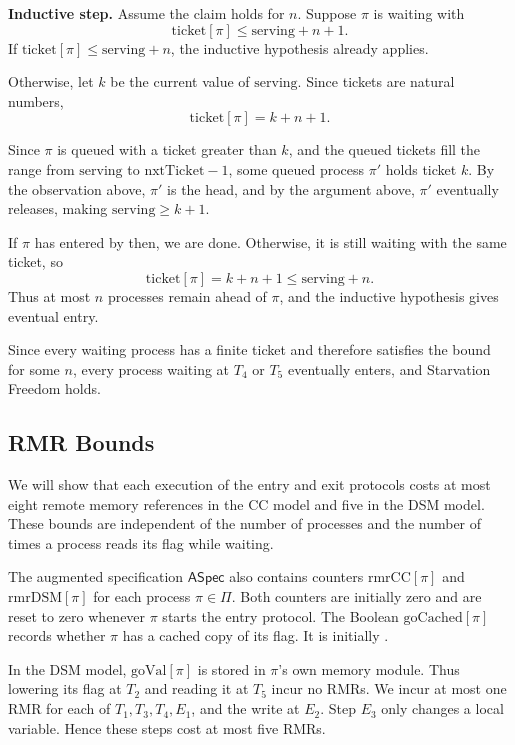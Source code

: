 \documentclass[12pt]{amsproc}
\begin{document}
\textbf{Inductive step.}
Assume the claim holds for $n$. Suppose $\pi$ is waiting with
\[
    \mathrm{ticket}[\pi]\le\mathrm{serving}+n+1.
\]
If $\mathrm{ticket}[\pi]\le\mathrm{serving}+n$, the inductive hypothesis already applies.

Otherwise, let $k$ be the current value of $\mathrm{serving}$. Since tickets are natural numbers,
\[
    \mathrm{ticket}[\pi]=k+n+1.
\]

Since $\pi$ is queued with a ticket greater than $k$, and the queued tickets fill the range from $\mathrm{serving}$ to $\mathrm{nxtTicket}-1$, some queued process $\pi'$ holds ticket $k$. By the observation above, $\pi'$ is the head, and by the argument above, $\pi'$ eventually releases, making $\mathrm{serving}\ge k+1$.

If $\pi$ has entered by then, we are done. Otherwise, it is still waiting with the same ticket, so
\[
    \mathrm{ticket}[\pi]
    =k+n+1
    \le\mathrm{serving}+n.
\]
Thus at most $n$ processes remain ahead of $\pi$, and the inductive hypothesis gives eventual entry.

Since every waiting process has a finite ticket and therefore satisfies the bound for some $n$, every process waiting at $T_4$ or $T_5$ eventually enters, and Starvation Freedom holds. 

\subsection{RMR Bounds}

\bbni

We will show that each execution of the entry and exit protocols costs at most eight remote memory references in the CC model and five in the DSM model. These bounds are independent of the number of processes and the number of times a process reads its flag while waiting.

The augmented specification $\mathsf{ASpec}$ also contains counters $\mathrm{rmrCC}[\pi]$ and $\mathrm{rmrDSM}[\pi]$ for each process $\pi\in\Pi$. Both counters are initially zero and are reset to zero whenever $\pi$ starts the entry protocol. The Boolean $\mathrm{goCached}[\pi]$ records whether $\pi$ has a cached copy of its flag. It is initially \False.

In the DSM model, $\mathrm{goVal}[\pi]$ is stored in $\pi$'s own memory module. Thus lowering its flag at $T_2$ and reading it at $T_5$ incur no RMRs. We incur at most one RMR for each of $T_1,T_3,T_4,E_1$, and the write at $E_2$. Step $E_3$ only changes a local variable. Hence these steps cost at most five RMRs.
\end{document}
